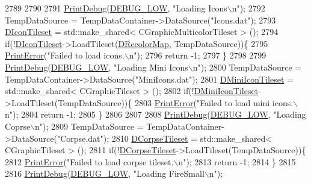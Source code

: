\begin{DoxyCode}
2789     
2790     
2791     \hyperlink{Debug_8h_aa5f00f5537c9760f6ae1782460748ab9}{PrintDebug}(\hyperlink{Debug_8h_a3a5f3fc09784650d8388cb854882f840}{DEBUG\_LOW}, \textcolor{stringliteral}{"Loading Icons\(\backslash\)n"});
2792     TempDataSource = TempDataContainer->DataSource(\textcolor{stringliteral}{"Icons.dat"});
2793     \hyperlink{classCApplicationData_a0577767a7fa045a51654b881608b1e7a}{DIconTileset} = std::make\_shared< CGraphicMulticolorTileset > ();
2794     \textcolor{keywordflow}{if}(!\hyperlink{classCApplicationData_a0577767a7fa045a51654b881608b1e7a}{DIconTileset}->LoadTileset(\hyperlink{classCApplicationData_afcbfb5d837afd5c117d91216d1988a53}{DRecolorMap}, TempDataSource))\{
2795         \hyperlink{Debug_8h_a2ed825eefefe35baf59a93a8c641323d}{PrintError}(\textcolor{stringliteral}{"Failed to load icons.\(\backslash\)n"});
2796         \textcolor{keywordflow}{return} -1;
2797     \}
2798     
2799     \hyperlink{Debug_8h_aa5f00f5537c9760f6ae1782460748ab9}{PrintDebug}(\hyperlink{Debug_8h_a3a5f3fc09784650d8388cb854882f840}{DEBUG\_LOW}, \textcolor{stringliteral}{"Loading Mini Icons\(\backslash\)n"});
2800     TempDataSource = TempDataContainer->DataSource(\textcolor{stringliteral}{"MiniIcons.dat"});
2801     \hyperlink{classCApplicationData_aa7d7e4c8be514246089546f4d98d74f2}{DMiniIconTileset} = std::make\_shared< CGraphicTileset > ();
2802     \textcolor{keywordflow}{if}(!\hyperlink{classCApplicationData_aa7d7e4c8be514246089546f4d98d74f2}{DMiniIconTileset}->LoadTileset(TempDataSource))\{
2803         \hyperlink{Debug_8h_a2ed825eefefe35baf59a93a8c641323d}{PrintError}(\textcolor{stringliteral}{"Failed to load mini icons.\(\backslash\)n"});
2804         \textcolor{keywordflow}{return} -1;
2805     \}
2806     
2807     
2808     \hyperlink{Debug_8h_aa5f00f5537c9760f6ae1782460748ab9}{PrintDebug}(\hyperlink{Debug_8h_a3a5f3fc09784650d8388cb854882f840}{DEBUG\_LOW}, \textcolor{stringliteral}{"Loading Coprse\(\backslash\)n"});
2809     TempDataSource = TempDataContainer->DataSource(\textcolor{stringliteral}{"Corpse.dat"});
2810     \hyperlink{classCApplicationData_aec983aa995cdb449344422d607fe0228}{DCorpseTileset} = std::make\_shared< CGraphicTileset > ();
2811     \textcolor{keywordflow}{if}(!\hyperlink{classCApplicationData_aec983aa995cdb449344422d607fe0228}{DCorpseTileset}->LoadTileset(TempDataSource))\{
2812         \hyperlink{Debug_8h_a2ed825eefefe35baf59a93a8c641323d}{PrintError}(\textcolor{stringliteral}{"Failed to load corpse tileset.\(\backslash\)n"});
2813         \textcolor{keywordflow}{return} -1;
2814     \}
2815     
2816     \hyperlink{Debug_8h_aa5f00f5537c9760f6ae1782460748ab9}{PrintDebug}(\hyperlink{Debug_8h_a3a5f3fc09784650d8388cb854882f840}{DEBUG\_LOW}, \textcolor{stringliteral}{"Loading FireSmall\(\backslash\)n"});

\end{DoxyCode}
